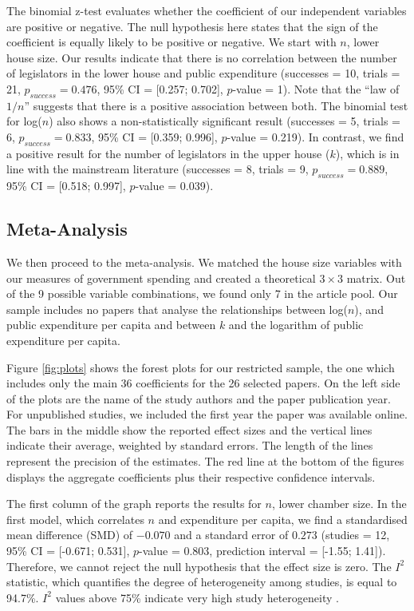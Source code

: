 \documentclass[a4paper,12pt]{article}
\begin{document}
The binomial z-test evaluates whether the coefficient of our independent
variables are positive or negative. The null hypothesis here states that the
sign of the coefficient is equally likely to be positive or negative. We start
with $n$, lower house size. Our results indicate that there is no correlation
between the number of legislators in the lower house and public expenditure 
(successes = 10, trials = 21, $p_{success} = 0.476$, 95\% CI = [0.257; 0.702],
$p$-value = 1). Note that the ``law of $1/n$'' suggests that there is a positive
association between both. The binomial test for log($n$) also shows a
non-statistically significant result (successes = 5, trials = 6, $p_{success} =
0.833$, 95\% CI = [0.359; 0.996], $p$-value = 0.219). In contrast, we find a
positive result for the number of legislators in the upper house ($k$), which is
in line with the mainstream literature (successes = 8, trials = 9, $p_{success}
= 0.889$, 95\% CI = [0.518; 0.997], $p$-value = 0.039). 

\subsection{Meta-Analysis}
\label{sub:Meta-Analysis}

We then proceed to the meta-analysis. We matched the house size variables with
our measures of government spending and created a theoretical $3 \times 3$
matrix. Out of the 9 possible variable combinations, we found only 7 in
the article pool. Our sample includes no papers that analyse the relationships
between log($n$), and public expenditure per capita and between $k$ and the
logarithm of public expenditure per capita.

Figure \ref{fig:plots} shows the forest plots for our restricted sample, the one
which includes only the main 36 coefficients for the 26 selected papers. On the
left side of the plots are the name of the study authors and the paper
publication year. For unpublished studies, we included the first year the paper
was available online. The bars in the middle show the reported effect sizes and
the vertical lines indicate their average, weighted by standard errors. The length
of the lines represent the precision of the estimates. The red line at the
bottom of the figures displays the aggregate coefficients plus their respective
confidence intervals.

The first column of the graph reports the results for $n$, lower chamber size.
In the first model, which correlates $n$ and expenditure per capita, we find a
standardised mean difference (SMD) of $-0.070$ and a standard error of $0.273$
(studies = 12, 95\% CI = [-0.671; 0.531], $p$-value = 0.803, prediction interval
= [-1.55; 1.41]). Therefore, we cannot reject the null hypothesis that the
effect size is zero. The $I^2$ statistic, which quantifies the degree of
heterogeneity among studies, is equal to 94.7\%. $I^2$ values above 75\%
indicate very high study heterogeneity \citep{higgins2019cochrane}.
\end{document}
